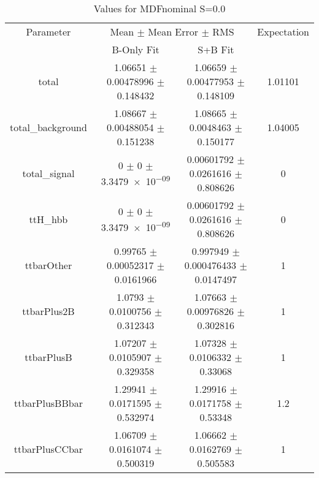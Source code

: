 \begin{table}
\centering
\caption{Values for MDFnominal S=0.0}
\begin{tabular}{cccc}
\toprule
Parameter & \multicolumn{2}{c}{Mean $\pm$ Mean Error $\pm$ RMS} & Expectation\\
 & B-Only Fit & S+B Fit & \\
\midrule
total & \num{1.06651} $\pm$ \num{0.00478996} $\pm$ \num{0.148432} & \num{1.06659} $\pm$ \num{0.00477953} $\pm$ \num{0.148109} & \num{1.01101}\\
total\_background & \num{1.08667} $\pm$ \num{0.00488054} $\pm$ \num{0.151238} & \num{1.08665} $\pm$ \num{0.0048463} $\pm$ \num{0.150177} & \num{1.04005}\\
total\_signal & \num{0} $\pm$ \num{0} $\pm$ \num{3.3479e-09} & \num{0.00601792} $\pm$ \num{0.0261616} $\pm$ \num{0.808626} & \num{0}\\
ttH\_hbb & \num{0} $\pm$ \num{0} $\pm$ \num{3.3479e-09} & \num{0.00601792} $\pm$ \num{0.0261616} $\pm$ \num{0.808626} & \num{0}\\
ttbarOther & \num{0.99765} $\pm$ \num{0.00052317} $\pm$ \num{0.0161966} & \num{0.997949} $\pm$ \num{0.000476433} $\pm$ \num{0.0147497} & \num{1}\\
ttbarPlus2B & \num{1.0793} $\pm$ \num{0.0100756} $\pm$ \num{0.312343} & \num{1.07663} $\pm$ \num{0.00976826} $\pm$ \num{0.302816} & \num{1}\\
ttbarPlusB & \num{1.07207} $\pm$ \num{0.0105907} $\pm$ \num{0.329358} & \num{1.07328} $\pm$ \num{0.0106332} $\pm$ \num{0.33068} & \num{1}\\
ttbarPlusBBbar & \num{1.29941} $\pm$ \num{0.0171595} $\pm$ \num{0.532974} & \num{1.29916} $\pm$ \num{0.0171758} $\pm$ \num{0.53348} & \num{1.2}\\
ttbarPlusCCbar & \num{1.06709} $\pm$ \num{0.0161074} $\pm$ \num{0.500319} & \num{1.06662} $\pm$ \num{0.0162769} $\pm$ \num{0.505583} & \num{1}\\
\bottomrule
\end{tabular}
\end{table}